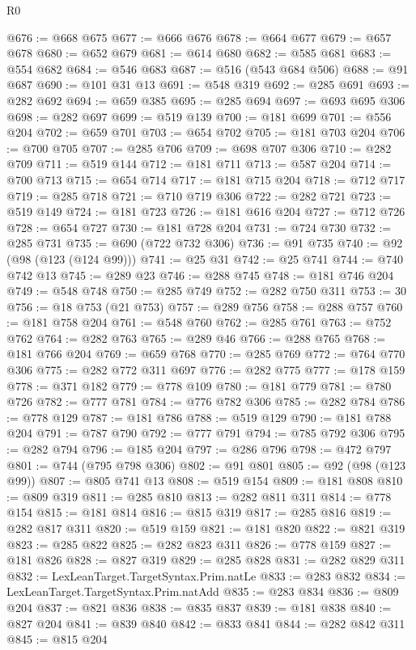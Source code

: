 \begin{lexlean}{R0}
\begin{coremodule}
@676 := @668 @675
@677 := @666 @676
@678 := @664 @677
@679 := @657 @678
@680 := @652 @679
@681 := @614 @680
@682 := @585 @681
@683 := @554 @682
@684 := @546 @683
@687 := @516 (@543 @684 @506)
@688 := @91 @687
@690 := @101 @31 @13
@691 := @548 @319
@692 := @285 @691
@693 := @282 @692
@694 := @659 @385
@695 := @285 @694
@697 := @693 @695 @306
@698 := @282 @697
@699 := @519 @139
@700 := @181 @699
@701 := @556 @204
@702 := @659 @701
@703 := @654 @702
@705 := @181 @703 @204
@706 := @700 @705
@707 := @285 @706
@709 := @698 @707 @306
@710 := @282 @709
@711 := @519 @144
@712 := @181 @711
@713 := @587 @204
@714 := @700 @713
@715 := @654 @714
@717 := @181 @715 @204
@718 := @712 @717
@719 := @285 @718
@721 := @710 @719 @306
@722 := @282 @721
@723 := @519 @149
@724 := @181 @723
@726 := @181 @616 @204
@727 := @712 @726
@728 := @654 @727
@730 := @181 @728 @204
@731 := @724 @730
@732 := @285 @731
@735 := @690 (@722 @732 @306)
@736 := @91 @735
@740 := @92 (@98 (@123 (@124 @99)))
@741 := @25 @31
@742 := @25 @741
@744 := @740 @742 @13
@745 := @289 @23
@746 := @288 @745
@748 := @181 @746 @204
@749 := @548 @748
@750 := @285 @749
@752 := @282 @750 @311
@753 := 30
@756 := @18 @753 (@21 @753)
@757 := @289 @756
@758 := @288 @757
@760 := @181 @758 @204
@761 := @548 @760
@762 := @285 @761
@763 := @752 @762
@764 := @282 @763
@765 := @289 @46
@766 := @288 @765
@768 := @181 @766 @204
@769 := @659 @768
@770 := @285 @769
@772 := @764 @770 @306
@775 := @282 @772 @311 @697
@776 := @282 @775
@777 := @178 @159
@778 := @371 @182
@779 := @778 @109
@780 := @181 @779
@781 := @780 @726
@782 := @777 @781
@784 := @776 @782 @306
@785 := @282 @784
@786 := @778 @129
@787 := @181 @786
@788 := @519 @129
@790 := @181 @788 @204
@791 := @787 @790
@792 := @777 @791
@794 := @785 @792 @306
@795 := @282 @794
@796 := @185 @204
@797 := @286 @796
@798 := @472 @797
@801 := @744 (@795 @798 @306)
@802 := @91 @801
@805 := @92 (@98 (@123 @99))
@807 := @805 @741 @13
@808 := @519 @154
@809 := @181 @808
@810 := @809 @319
@811 := @285 @810
@813 := @282 @811 @311
@814 := @778 @154
@815 := @181 @814
@816 := @815 @319
@817 := @285 @816
@819 := @282 @817 @311
@820 := @519 @159
@821 := @181 @820
@822 := @821 @319
@823 := @285 @822
@825 := @282 @823 @311
@826 := @778 @159
@827 := @181 @826
@828 := @827 @319
@829 := @285 @828
@831 := @282 @829 @311
@832 := LexLeanTarget.TargetSyntax.Prim.natLe
@833 := @283 @832
@834 := LexLeanTarget.TargetSyntax.Prim.natAdd
@835 := @283 @834
@836 := @809 @204
@837 := @821 @836
@838 := @835 @837
@839 := @181 @838
@840 := @827 @204
@841 := @839 @840
@842 := @833 @841
@844 := @282 @842 @311
@845 := @815 @204

\end{coremodule}
\end{lexlean}
